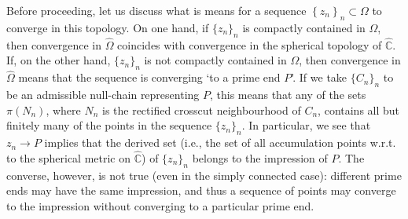 \documentclass[11pt,a4paper,reqno]{amsart}
\theoremstyle{plain}
\theoremstyle{definition}
\theoremstyle{plain}
\def\Chat{\widehat{\mathbb{C}}}
\begin{document}
Before proceeding, let us discuss what is means for a sequence $ \left\lbrace z_n\right\rbrace _n \subset \Omega$ to converge in this topology. On one hand, if $\{z_n\}_n$ is compactly contained in $\Omega$, then convergence in $\widehat\Omega$ coincides with convergence in the spherical topology of $\Chat$. If, on the other hand, $\{z_n\}_n$ is not compactly contained in $\Omega$, then convergence in $\widehat\Omega$ means that the sequence is converging `to a prime end $P$'. If we take $\{C_n\}_n$ to be an admissible null-chain representing $P$, this means that any of the sets $\pi(N_n)$, where $N_n$ is the rectified crosscut neighbourhood of $C_n$, contains all but finitely many of the points in the sequence $\{z_n\}_n$. In particular, we see that $z_n\to P$ implies that the derived set (i.e., the set of all accumulation points w.r.t. to the spherical metric on $\Chat$) of $\{z_n\}_n$ belongs to the impression of $P$. The converse, however, is not true (even in the simply connected case): different prime ends may have the same impression, and thus a sequence of points may converge to the impression without converging to a particular prime end.
\end{document}
